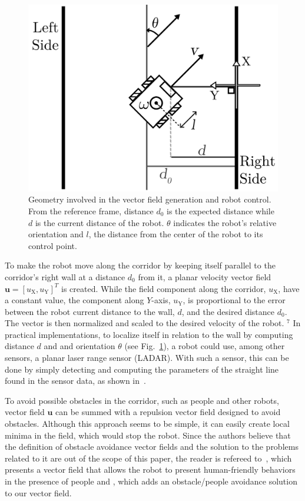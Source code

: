 \documentclass[smallcondensed]{svjour3}
\begin{document}
\begin{figure}[h]
	\centering
	\includegraphics[width=0.8\linewidth]{Figures/Fig9.pdf}
	\caption{Geometry involved in the vector field generation and robot control. From the reference frame, distance ${d_\text{0}}$ is the expected distance while ${d}$ is the current distance of the robot. $\theta$ indicates the robot's relative orientation and $l$, the distance from the center of the robot to its control point.}
	\label{fig:navigation}
\end{figure}

To make the robot move along the corridor by keeping itself parallel to the corridor's right wall at a distance $d_0$ from it, a planar velocity vector field $\mathbf{u}=[u_\text{X}, u_\text{Y}]^T$ is created. While the field component along the corridor, $u_\text{X}$,  have a constant value, the component along $Y$-axis,  $u_\text{Y}$, is proportional to the error between the robot current distance to the wall, $d$, and the desired distance $d_\text{0}$. The vector is then normalized and scaled to the desired velocity of the robot. {\color{blue} $^7$ In practical implementations, to localize itself in relation to the wall by computing distance $d$ and and orientation $\theta$ (see Fig.~\ref{fig:navigation}), a robot could use, among other sensors, a planar laser range sensor (LADAR). With such a sensor, this can be done by simply detecting and computing the parameters of the straight line found in the sensor data, as shown in~\cite{Arthur2015}}.

To avoid possible obstacles in the corridor, such as people and other robots, vector field $\mathbf{u}$ can be summed with a repulsion vector field designed to avoid obstacles. Although this approach seems to be simple, it can easily create local minima in the field, which would stop the robot. Since the authors believe that the definition of obstacle avoidance vector fields and the solution to the problems related to it are out of the scope of this paper, the reader is refereed to~\cite{lam2011human}, which presents a vector field that allows the robot to present human-friendly behaviors in the presence of people and \cite{Arthur2015}, which adds an obstacle/people avoidance solution to our vector field.
\end{document}
